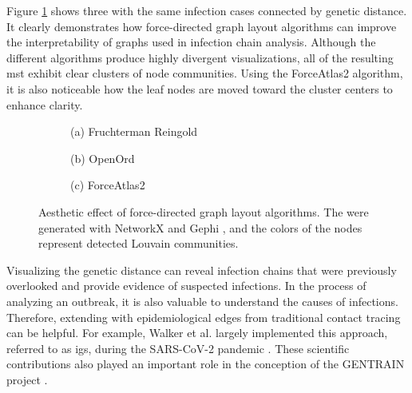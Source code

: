 Figure \ref{fig:force_directed_graph_layout} shows three  with the same infection cases connected by genetic distance. It clearly demonstrates how force-directed graph layout algorithms can improve the interpretability of graphs used in infection chain analysis. Although the different algorithms produce highly divergent visualizations, all of the resulting \acrshort{mst} exhibit clear clusters of node communities. Using the ForceAtlas2 algorithm, it is also noticeable how the leaf nodes are moved toward the cluster centers to enhance clarity.

\begin{figure}[ht!]
  \centering
  \begin{subfigure}[b]{0.32\textwidth}
    
    \caption*{(a) Fruchterman Reingold}
  \end{subfigure}
  \hfill
  \begin{subfigure}[b]{0.32\textwidth}
    
    \caption*{(b) OpenOrd}
  \end{subfigure}
    \begin{subfigure}[b]{0.32\textwidth}
    
    \caption*{(c) ForceAtlas2}
  \end{subfigure}
    \caption[Aesthetic effect of force-directed graph layout algorithms]{Aesthetic effect of force-directed graph layout algorithms. The  were generated with NetworkX \cite{Net1} and Gephi \cite{Gep1}, and the colors of the nodes represent detected Louvain communities.}
  \label{fig:force_directed_graph_layout}
\end{figure}

Visualizing the genetic distance can reveal infection chains that were previously overlooked and provide evidence of suspected infections. In the process of analyzing an outbreak, it is also valuable to understand the causes of infections. Therefore, extending  with epidemiological edges from traditional contact tracing can be helpful. For example, Walker et al. largely implemented this approach, referred to as \acrfull{igs}, during the SARS-CoV-2 pandemic \cite{Wal1}. These scientific contributions also played an important role in the conception of the GENTRAIN project \cite{Fra1}.

